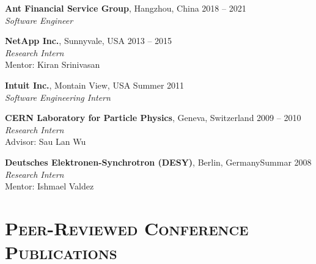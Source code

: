 \documentclass[10pt, letterpaper]{article}
\renewenvironment{itemize}{
  \begin{list}{}{
    \setlength{\leftmargin}{1.2em}
    \setlength{\itemsep}{0.12em}
    \setlength{\parskip}{0pt}
    \setlength{\parsep}{0.12em}
  }
}{
  \end{list}
}
\begin{document}
\begin{itemize}

\item {\bf Ant Financial Service Group}, Hangzhou, China \hfill 2018 -- 2021\\
{\it Software Engineer} %

\item {\bf NetApp Inc.}, Sunnyvale, USA \hfill 2013 -- 2015\\
{\it Research Intern} \\ Mentor: Kiran Srinivasan

\item {\bf Intuit Inc.}, Montain View, USA \hfill Summer 2011\\
{\it Software Engineering Intern} %

\item {\bf CERN Laboratory for Particle Physics}, Geneva, Switzerland
  \hfill 2009 -- 2010\\
{\it Research Intern} \\Advisor: Sau Lan Wu

\item {\bf Deutsches Elektronen-Synchrotron (DESY)}, Berlin, Germany\hfill Summar 2008\\
{\it Research Intern} \\Mentor: Ishmael Valdez
\end{itemize}



\section*{\textsc{Peer-Reviewed Conference Publications}}
\end{document}
